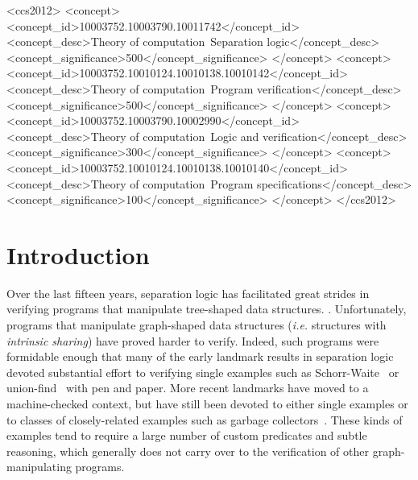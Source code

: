 \documentclass[acmsmall,screen]{acmart}
\begin{document}
\begin{CCSXML}
<ccs2012>
<concept>
<concept_id>10003752.10003790.10011742</concept_id>
<concept_desc>Theory of computation~Separation logic</concept_desc>
<concept_significance>500</concept_significance>
</concept>
<concept>
<concept_id>10003752.10010124.10010138.10010142</concept_id>
<concept_desc>Theory of computation~Program verification</concept_desc>
<concept_significance>500</concept_significance>
</concept>
<concept>
<concept_id>10003752.10003790.10002990</concept_id>
<concept_desc>Theory of computation~Logic and verification</concept_desc>
<concept_significance>300</concept_significance>
</concept>
<concept>
<concept_id>10003752.10010124.10010138.10010140</concept_id>
<concept_desc>Theory of computation~Program specifications</concept_desc>
<concept_significance>100</concept_significance>
</concept>
</ccs2012>
\end{CCSXML}







\maketitle

\section{Introduction}
\label{dummyref} \label{sec:intro}
Over the last fifteen years, separation logic has facilitated great strides
in verifying programs that manipulate tree-shaped data structures.
\citep{berdine:smallfoot,chin:hipsleek,jacobs:verifast,
chlipala:bedrock,bengtson:charge,appel:programlogics}.
Unfortunately, programs that manipulate graph-shaped data structures
(\emph{i.e.} structures with \emph{intrinsic sharing}) have proved harder to verify.
Indeed, such programs were formidable enough that many of the early
landmark results in separation logic devoted substantial effort to verifying
single examples such as Schorr-Waite~\cite{hongseok:phd} or
union-find~\cite{neelthesis} with pen and paper.
More recent landmarks have moved to a machine-checked context, but have still
been devoted to either single examples or to classes of closely-related examples
such as garbage collectors~\cite{gcexample3,cakemlgc}.
These kinds of examples tend to require a large number
of custom predicates and subtle reasoning, which generally
does not carry over
to the verification of other graph-manipulating programs.
\end{document}
